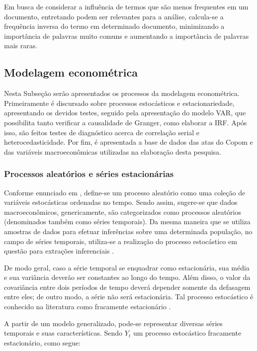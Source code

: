 Em busca de considerar a influência de termos que são menos frequentes em um documento, entretando podem ser relevantes para a análise, calcula-se a frequência inversa do termo em determinado documento, minimizando a importância de palavras muito comuns e aumentando a importância de palavras mais raras. 

\subsection{Modelagem econométrica}

Nesta Subseção serão apresentados os processos da modelagem econométrica. Primeiramente é discursado sobre processos estocásticos e estacionariedade, apresentando os devidos testes, seguido pela apresentação do modelo VAR, que possibilita tanto verificar a causalidade de Granger, como elaborar a IRF. Após isso, são feitos testes de diagnóstico acerca de correlação serial e heterocedasticidade. Por fim, é apresentada a base de dados das atas do Copom e das variáveis macroeconômicas utilizadas na elaboração desta pesquisa.

\subsubsection{Processos aleatórios e séries estacionárias}

Conforme enunciado em , define-se um processo aleatório como uma coleção de variáveis estocásticas ordenadas no tempo. Sendo assim, sugere-se que dados macroeconômicos, genericamente, são categorizados como processos aleatórios (denominados também como séries temporais). Da mesma maneira que se utiliza amostras de dados para efetuar inferências sobre uma determinada população, no campo de séries temporais, utiliza-se a realização do processo estocástico em questão para extrações inferenciais \cite{gujarati_ecn2011}.

De modo geral, caso a série temporal se enquadrar como estacionária, sua média e sua variância deverão ser constantes ao longo do tempo. Além disso, o valor da covariância entre dois períodos de tempo deverá depender somente da defasagem entre eles; de outro modo, a série não será estacionária. Tal processo estocástico é conhecido na literatura como fracamente estacionário \cite{gujarati_ecn2011, morettin2017estatistica}.

A partir de um modelo generalizado, pode-se representar diversas séries temporais e suas características. Sendo $Y_{t}$ um processo estocástico fracamente estacionário, como segue:

